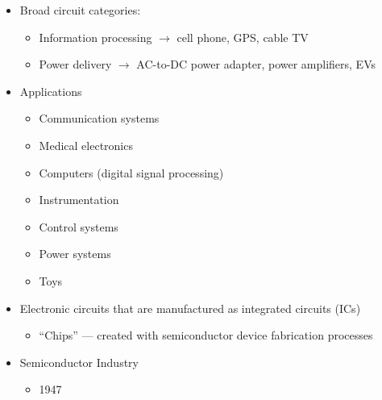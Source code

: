 \begin{itemize}

  \item Broad circuit categories:

    \begin{itemize}

      \item Information processing $\to$ cell phone, GPS, cable TV

      \item Power delivery $\to$ AC-to-DC power adapter, power amplifiers, EVs

    \end{itemize}

  \item Applications

    \begin{itemize}

      \item Communication systems

      \item Medical electronics

      \item Computers (digital signal processing)

      \item Instrumentation

      \item Control systems

      \item Power systems

      \item Toys

    \end{itemize}

  \item Electronic circuits that are manufactured as integrated circuits (ICs)

    \begin{itemize}

      \item ``Chips'' — created with semiconductor device fabrication processes

    \end{itemize}

  \item Semiconductor Industry

    \begin{itemize}

      \item 1947


\end{itemize}
\end{itemize}
